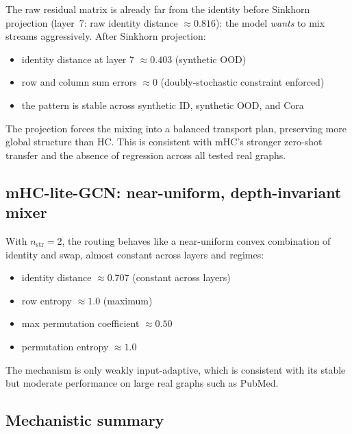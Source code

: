 \documentclass[11pt,a4paper]{article}
\begin{document}
The raw residual matrix is already far from the identity
before Sinkhorn projection (layer~7:
raw identity distance $\approx 0.816$):
the model \emph{wants} to mix streams aggressively.
After Sinkhorn projection:

\begin{itemize}[noitemsep]
  \item identity distance at layer 7 $\approx 0.403$ (synthetic OOD)
  \item row and column sum errors $\approx 0$
        (doubly-stochastic constraint enforced)
  \item the pattern is stable across synthetic ID, synthetic OOD,
        and Cora
\end{itemize}

The projection forces the mixing into a balanced transport plan,
preserving more global structure than HC.
This is consistent with mHC's stronger zero-shot transfer
and the absence of regression across all tested real graphs.

\subsection{mHC-lite-GCN: near-uniform, depth-invariant mixer}

With $n_\text{str}=2$, the routing behaves like a near-uniform
convex combination of identity and swap, almost constant across
layers and regimes:

\begin{itemize}[noitemsep]
  \item identity distance $\approx 0.707$ (constant across layers)
  \item row entropy $\approx 1.0$ (maximum)
  \item max permutation coefficient $\approx 0.50$
  \item permutation entropy $\approx 1.0$
\end{itemize}

The mechanism is only weakly input-adaptive, which is consistent
with its stable but moderate performance on large real graphs
such as PubMed.

\subsection{Mechanistic summary}
\label{sec:citeseer-collapse}
\end{document}
